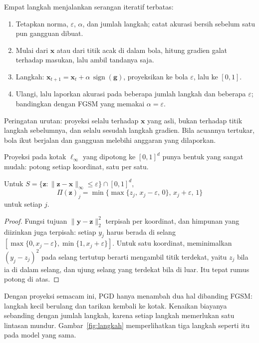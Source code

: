 \begin{resep}
Empat langkah menjalankan serangan iteratif terbatas:
\begin{enumerate}
  \item Tetapkan norma, $\varepsilon$, $\alpha$, dan jumlah langkah; catat akurasi
        bersih sebelum satu pun gangguan dibuat.
  \item Mulai dari $\mathbf{x}$ atau dari titik acak di dalam bola, hitung gradien
        galat terhadap masukan, lalu ambil tandanya saja.
  \item Langkah: $\mathbf{x}_{t+1}=\mathbf{x}_t+\alpha\,\operatorname{sign}(\mathbf{g})$,
        proyeksikan ke bola $\varepsilon$, lalu ke $[0,1]$.
  \item Ulangi, lalu laporkan akurasi pada beberapa jumlah langkah dan beberapa
        $\varepsilon$; bandingkan dengan FGSM yang memakai $\alpha=\varepsilon$.
\end{enumerate}
Peringatan urutan: proyeksi selalu terhadap $\mathbf{x}$ yang asli, bukan terhadap
titik langkah sebelumnya, dan selalu sesudah langkah gradien. Bila acuannya tertukar,
bola ikut berjalan dan gangguan melebihi anggaran yang dilaporkan.
\end{resep}

Proyeksi pada kotak $\ell_\infty$ yang dipotong ke $[0,1]^d$ punya bentuk yang sangat
mudah: potong setiap koordinat, satu per satu.

\begin{proposisi}
Untuk $S=\{\mathbf{z}:\lVert\mathbf{z}-\mathbf{x}\rVert_\infty\le\varepsilon\}
\cap[0,1]^{d}$,
\[
  \Pi(\mathbf{z})_j=\min\bigl\{\max\{z_j,\,x_j-\varepsilon,\,0\},\,
  x_j+\varepsilon,\,1\bigr\}
\]
untuk setiap $j$.
\end{proposisi}

\begin{proof}
Fungsi tujuan $\lVert\mathbf{y}-\mathbf{z}\rVert_2^2$ terpisah per koordinat, dan
himpunan yang diizinkan juga terpisah: setiap $y_j$ harus berada di selang
$[\max\{0,x_j-\varepsilon\},\min\{1,x_j+\varepsilon\}]$. Untuk satu koordinat,
meminimalkan $(y_j-z_j)^2$ pada selang tertutup berarti mengambil titik terdekat,
yaitu $z_j$ bila ia di dalam selang, dan ujung selang yang terdekat bila di luar.
Itu tepat rumus potong di atas.
\end{proof}

Dengan proyeksi semacam ini, PGD hanya menambah dua hal dibanding FGSM: langkah
kecil berulang dan tarikan kembali ke kotak. Kenaikan biayanya sebanding dengan
jumlah langkah, karena setiap langkah memerlukan satu lintasan mundur. Gambar~\ref{fig:langkah} memperlihatkan tiga
langkah seperti itu pada model yang sama.

